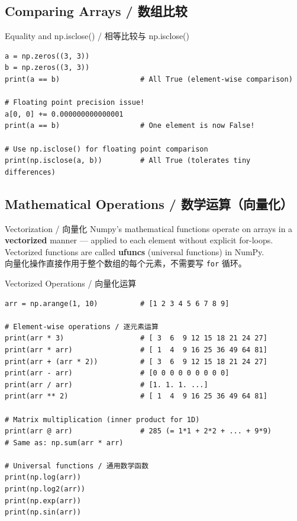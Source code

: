 \documentclass[11pt,a4paper]{report}
\let\oldtexttt\texttt
\renewcommand{\texttt}[1]{\textcolor{mainblue}{\oldtexttt{#1}}}
\begin{document}
\subsection{Comparing Arrays / 数组比较}

\begin{examplebox}{Equality and np.isclose() / 相等比较与 np.isclose()}
\begin{lstlisting}
a = np.zeros((3, 3))
b = np.zeros((3, 3))
print(a == b)                   # All True (element-wise comparison)

# Floating point precision issue!
a[0, 0] += 0.000000000000001
print(a == b)                   # One element is now False!

# Use np.isclose() for floating point comparison
print(np.isclose(a, b))         # All True (tolerates tiny differences)
\end{lstlisting}
\end{examplebox}

\subsection{Mathematical Operations / 数学运算（向量化）}

\begin{concept}{Vectorization / 向量化}
    Numpy's mathematical functions operate on arrays in a \textbf{vectorized} manner — applied to each element without explicit for-loops. Vectorized functions are called \textbf{ufuncs} (universal functions) in NumPy. \\
    向量化操作直接作用于整个数组的每个元素，不需要写 \texttt{for} 循环。
\end{concept}

\begin{examplebox}{Vectorized Operations / 向量化运算}
\begin{lstlisting}
arr = np.arange(1, 10)          # [1 2 3 4 5 6 7 8 9]

# Element-wise operations / 逐元素运算
print(arr * 3)                  # [ 3  6  9 12 15 18 21 24 27]
print(arr * arr)                # [ 1  4  9 16 25 36 49 64 81]
print(arr + (arr * 2))          # [ 3  6  9 12 15 18 21 24 27]
print(arr - arr)                # [0 0 0 0 0 0 0 0 0]
print(arr / arr)                # [1. 1. 1. ...]
print(arr ** 2)                 # [ 1  4  9 16 25 36 49 64 81]

# Matrix multiplication (inner product for 1D)
print(arr @ arr)                # 285 (= 1*1 + 2*2 + ... + 9*9)
# Same as: np.sum(arr * arr)

# Universal functions / 通用数学函数
print(np.log(arr))
print(np.log2(arr))
print(np.exp(arr))
print(np.sin(arr))
\end{lstlisting}
\end{examplebox}
\end{document}
